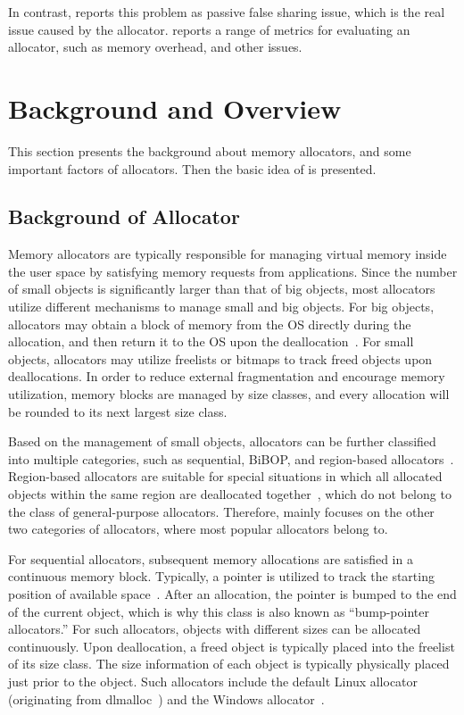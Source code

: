 In contrast, \MP{} reports this problem as passive false sharing issue, which is the real issue caused by the allocator. \MP{} reports a range of metrics for evaluating an allocator, such as memory overhead, and other issues. 

\section{Background and Overview}
\label{sec:background}

This section presents the background about memory allocators, and some important factors of allocators. Then the basic idea of \MP{} is presented. 

\subsection{Background of Allocator}

\label{sec:allocator}
Memory allocators are typically responsible for managing virtual memory inside the user space by satisfying memory requests from applications. Since the number of small objects is significantly larger than that of big objects, most allocators utilize different mechanisms to manage small and big objects. For big objects, allocators may obtain a block of memory from the OS directly during the allocation, and then return it to the OS upon the deallocation~\citep{Hoard}. For small objects, allocators may utilize freelists or bitmaps to track freed objects upon deallocations. In order to reduce external fragmentation and encourage memory utilization, memory blocks are managed by size classes, and every allocation will be rounded to its next largest size class.  

Based on the management of small objects, allocators can be further classified into multiple categories, such as sequential, BiBOP, and region-based allocators~\citep{DieHarder, Gay:1998:MME:277650.277748}. Region-based allocators are suitable for special situations in which all allocated objects within the same region are deallocated together~\citep{Gay:1998:MME:277650.277748}, which do not belong to the class of general-purpose allocators. Therefore, \MP{} mainly focuses on the other two categories of allocators, where most popular allocators belong to.

For sequential allocators, subsequent memory allocations are satisfied in a continuous memory block. Typically, a pointer is utilized to track the starting position of available space~\citep{Cling}. After an allocation, the pointer is bumped to the end of the current object, which is why this class is also known as ``bump-pointer allocators.'' For such allocators, objects with different sizes can be allocated continuously. Upon deallocation, a freed object is typically placed into the freelist of its size class. The size information of each object is typically physically placed just prior to the object. Such allocators include the default Linux allocator (originating from dlmalloc~\citep{dlmalloc}) and the Windows allocator~\citep{DieHarder}.  


